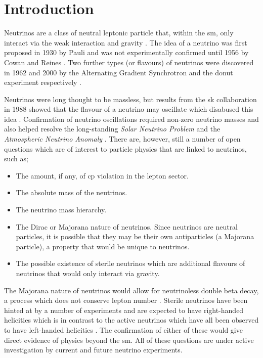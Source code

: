 \chapter{Introduction}
\label{chap:Introduction}


Neutrinos are a class of neutral leptonic particle that, within the \gls{sm}, only interact via the weak interaction and gravity \cite{Particles_and_Fundamental_Interactions:_An_Introduction_to_Particle_Physics}. The idea of a neutrino was first proposed in 1930 by Pauli and was not experimentally confirmed until 1956 by Cowan and Reines \cite{Pauli_letter} \cite{cowan_and_reines_paper}. Two further types (or flavours) of neutrinos were discovered in 1962 and 2000 by the Alternating Gradient Synchrotron and the \Gls{donut} experiment respectively \cite{Muon_neutrino_discovery} \cite{DONUT}. 

Neutrinos were long thought to be massless, but results from the \gls{sk} collaboration in 1988 showed that the flavour of a neutrino may oscillate which disabused this idea \cite{SuperK_neutrino_oscillations}. Confirmation of neutrino oscillations required non-zero neutrino masses and also helped resolve the long-standing \textit{Solar Neutrino Problem} and the \textit{Atmospheric Neutrino Anomaly} \cite{Homestake} \cite{Atmospheric_anomaly}. There are, however, still a number of open questions which are of interest to particle physics that are linked to neutrinos, such as; 
\begin{itemize}
    \item The amount, if any, of \gls{cp} violation in the lepton sector.
    \item The absolute mass of the neutrinos.
    \item The neutrino mass hierarchy. 
    \item The Dirac or Majorana nature of neutrinos. Since neutrinos are neutral particles, it is possible that they may be their own antiparticles (a Majorana particle), a property that would be unique to neutrinos. 
    \item The possible existence of sterile neutrinos which are additional flavours of neutrinos that would only interact via gravity. 
\end{itemize}
The Majorana nature of neutrinos would allow for neutrinoless double beta decay, a process which does not conserve lepton number \cite{neutrinoless_double_beta_decay}. Sterile neutrinos have been hinted at by a number of experiments and are expected to have right-handed helicities which is in contrast to the active neutrinos which have all been observed to have left-handed helicities \cite{White_Paper}. The confirmation of either of these would give direct evidence of physics beyond the \gls{sm}. All of these questions are under active investigation by current and future neutrino experiments. 

